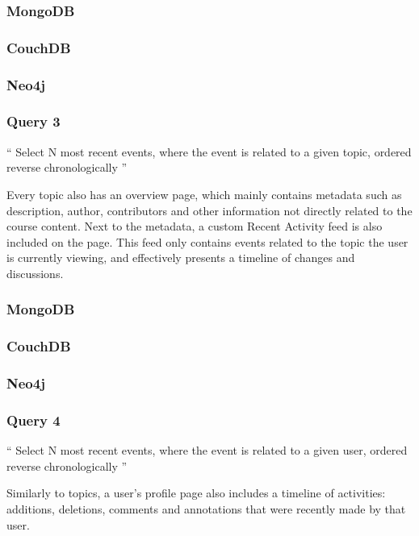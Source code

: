 \subsubsection*{MongoDB}
\subsubsection*{CouchDB}
\subsubsection*{Neo4j}

\subsubsection{Query 3}
\label{subsubsec:query-3}

``
Select N most recent events, where the event is related to a given topic, ordered reverse chronologically
''

Every topic also has an overview page, which mainly contains metadata such as description, author, contributors and other information not directly related to the course content.
Next to the metadata, a custom Recent Activity feed is also included on the page.
This feed only contains events related to the topic the user is currently viewing, and effectively presents a timeline of changes and discussions.

\subsubsection*{MongoDB}
\subsubsection*{CouchDB}
\subsubsection*{Neo4j}

\subsubsection{Query 4}
\label{subsubsec:query-4}

``
Select N most recent events, where the event is related to a given user, ordered reverse chronologically
''

Similarly to topics, a user's profile page also includes a timeline of  activities: additions, deletions, comments and annotations that were recently made by that user.

